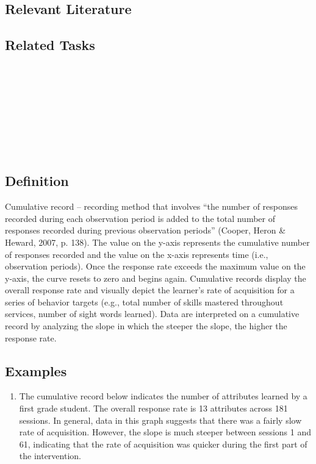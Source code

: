 \subsection{Relevant Literature}
\begin{refsection}
\nocite{cooper2007applied,
    alberto2013applied,
    ledford2009single,
    vanselow2012online}
\printbibliography[heading=none]
\end{refsection}
%
\subsection{Related Tasks}
\fourhOne{}\\
\fourhTwo{}\\
\fourhThree{}\\
\fourhFour{}\\
\fourhFive{}\\
\fourFKFourtySeven{}\\
\fourjFifteen{}\\
%
\clearpage \section[\fouraEleven{}]{\fouraEleven{}%
              }
\subsection{Definition}
Cumulative record – recording method that involves ``the number of responses recorded during each observation period is added to the total number of responses recorded during previous observation periods'' (Cooper, Heron \& Heward, 2007, p. 138). The value on the y-axis represents the cumulative number of responses recorded and the value on the x-axis represents time (i.e., observation periods).  Once the response rate exceeds the maximum value on the y-axis, the curve resets to zero and begins again.  Cumulative records display the overall response rate and visually depict the learner's rate of acquisition for a series of behavior targets (e.g., total number of skills mastered throughout services, number of sight words learned).  Data are interpreted on a cumulative record by analyzing the slope in which the steeper the slope, the higher the response rate.
%
\subsection{Examples}
\begin{enumerate}
\item The cumulative record below indicates the number of attributes learned by a first grade student.  The overall response rate is 13 attributes across 181 sessions.  In general, data in this graph suggests that there was a fairly slow rate of acquisition. However, the slope is much steeper between sessions 1 and 61, indicating that the rate of acquisition was quicker during the first part of the intervention. 
\end{enumerate}
%
